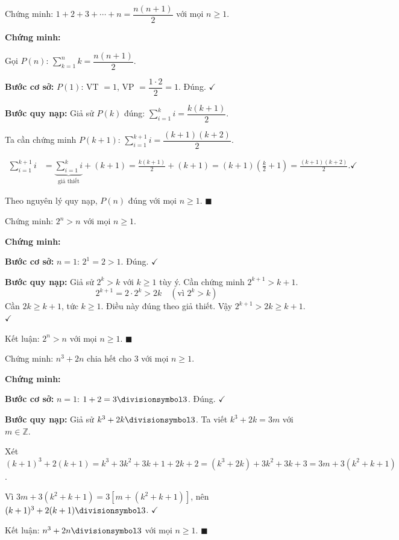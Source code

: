 \documentclass[12pt,a4paper]{article}
\begin{document}
\begin{vidu}[title={Chứng minh tổng}]
  Chứng minh: $1 + 2 + 3 + \cdots + n = \dfrac{n(n+1)}{2}$ với mọi $n \ge 1$.

  \medskip\textbf{Chứng minh:}

  Gọi $P(n)$: $\displaystyle\sum_{k=1}^n k = \dfrac{n(n+1)}{2}$.

  \textbf{Bước cơ sở:} $P(1)$: VT $= 1$, VP $= \dfrac{1\cdot 2}{2} = 1$. Đúng. $\checkmark$

  \textbf{Bước quy nạp:} Giả sử $P(k)$ đúng: $\displaystyle\sum_{i=1}^k i = \dfrac{k(k+1)}{2}$.

  Ta cần chứng minh $P(k+1)$: $\displaystyle\sum_{i=1}^{k+1} i = \dfrac{(k+1)(k+2)}{2}$.

  \begin{align*}
    \sum_{i=1}^{k+1} i &= \underbrace{\sum_{i=1}^k i}_{\text{giả thiết}} + (k+1)
    = \frac{k(k+1)}{2} + (k+1)
    = (k+1)\!\left(\frac{k}{2} + 1\right)
    = \frac{(k+1)(k+2)}{2}. \checkmark
  \end{align*}

  Theo nguyên lý quy nạp, $P(n)$ đúng với mọi $n \ge 1$. $\blacksquare$
\end{vidu}

\begin{vidu}[title={Chứng minh bất đẳng thức}]
  Chứng minh: $2^n > n$ với mọi $n \ge 1$.

  \medskip\textbf{Chứng minh:}

  \textbf{Bước cơ sở:} $n=1$: $2^1 = 2 > 1$. Đúng. $\checkmark$

  \textbf{Bước quy nạp:} Giả sử $2^k > k$ với $k \ge 1$ tùy ý. Cần chứng minh $2^{k+1} > k+1$.
  \[
    2^{k+1} = 2 \cdot 2^k > 2k \quad (\text{vì } 2^k > k)
  \]
  Cần $2k \ge k+1$, tức $k \ge 1$. Điều này đúng theo giả thiết.
  Vậy $2^{k+1} > 2k \ge k+1$. $\checkmark$

  Kết luận: $2^n > n$ với mọi $n \ge 1$. $\blacksquare$
\end{vidu}

\begin{vidu}[title={Chứng minh chia hết}]
  Chứng minh: $n^3 + 2n$ chia hết cho $3$ với mọi $n \ge 1$.

  \medskip\textbf{Chứng minh:}

  \textbf{Bước cơ sở:} $n=1$: $1+2=3 \divisionsymbol 3$. Đúng. $\checkmark$

  \textbf{Bước quy nạp:} Giả sử $k^3+2k \divisionsymbol 3$. Ta viết $k^3+2k=3m$ với $m\in\mathbb{Z}$.

  Xét $(k+1)^3+2(k+1) = k^3+3k^2+3k+1+2k+2 = (k^3+2k) + 3k^2+3k+3 = 3m + 3(k^2+k+1)$.

  Vì $3m + 3(k^2+k+1) = 3[m+(k^2+k+1)]$, nên $(k+1)^3+2(k+1) \divisionsymbol 3$. $\checkmark$

  Kết luận: $n^3+2n \divisionsymbol 3$ với mọi $n \ge 1$. $\blacksquare$
\end{vidu}
\end{document}
